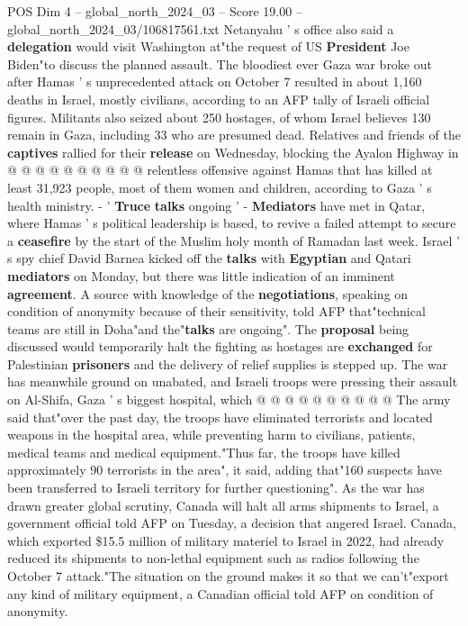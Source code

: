 \begin{textsample}{POS Dim 4 – global\_north\_2024\_03 – Score 19.00 – global\_north\_2024\_03/106817561.txt}
Netanyahu ' s office also said a \textbf{delegation} would visit Washington at"the request of US \textbf{President} Joe Biden"to discuss the planned assault.
The bloodiest ever Gaza war broke out after Hamas ' s unprecedented attack on October 7 resulted in about 1,160 deaths in Israel, mostly civilians, according to an AFP tally of Israeli official figures.
Militants also seized about 250 hostages, of whom Israel believes 130 remain in Gaza, including 33 who are presumed dead.
Relatives and friends of the \textbf{captives} rallied for their \textbf{release} on Wednesday, blocking the Ayalon Highway in @ @ @ @ @ @ @ @ @ @ relentless offensive against Hamas that has killed at least 31,923 people, most of them women and children, according to Gaza ' s health ministry. - ' \textbf{Truce} \textbf{talks} ongoing ' - \textbf{Mediators} have met in Qatar, where Hamas ' s political leadership is based, to revive a failed attempt to secure a \textbf{ceasefire} by the start of the Muslim holy month of Ramadan last week.
Israel ' s spy chief David Barnea kicked off the \textbf{talks} with \textbf{Egyptian} and Qatari \textbf{mediators} on Monday, but there was little indication of an imminent \textbf{agreement}.
A source with knowledge of the \textbf{negotiations}, speaking on condition of anonymity because of their sensitivity, told AFP that"technical teams are still in Doha"and the"\textbf{talks} are ongoing".
The \textbf{proposal} being discussed would temporarily halt the fighting as hostages are \textbf{exchanged} for Palestinian \textbf{prisoners} and the delivery of relief supplies is stepped up.
The war has meanwhile ground on unabated, and Israeli troops were pressing their assault on Al-Shifa, Gaza ' s biggest hospital, which @ @ @ @ @ @ @ @ @ @ The army said that"over the past day, the troops have eliminated terrorists and located weapons in the hospital area, while preventing harm to civilians, patients, medical teams and medical equipment."Thus far, the troops have killed approximately 90 terrorists in the area", it said, adding that"160 suspects have been transferred to Israeli territory for further questioning".
As the war has drawn greater global scrutiny, Canada will halt all arms shipments to Israel, a government official told AFP on Tuesday, a decision that angered Israel.
Canada, which exported \$15.5 million of military materiel to Israel in 2022, had already reduced its shipments to non-lethal equipment such as radios following the October 7 attack."The situation on the ground makes it so that we can't"export any kind of military equipment, a Canadian official told AFP on condition of anonymity.

\end{textsample}
